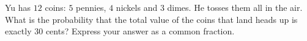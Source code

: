 Yu has $12$ coins: $5$ pennies, $4$ nickels and $3$ dimes. He tosses them all in the air. What is the probability that the total value of the coins that land heads up is exactly $30$ cents? Express your answer as a common fraction.
